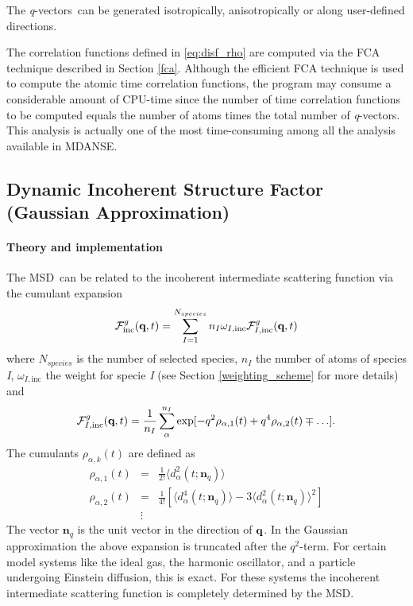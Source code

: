 \documentclass[a4paper,11pt]{article}
\newcommand{\qvects}{\textit{q}-vectors}
\begin{document}
The \qvects\ can be generated isotropically, anisotropically or along user-defined directions.

The correlation functions defined in \ref{eq:disf_rho} are computed via the \gls{FCA} technique described in Section \ref{fca}.
Although the efficient \gls{FCA} technique is used to compute the atomic time correlation functions, the program may consume a 
considerable amount of CPU-time since the number of time correlation functions to be computed equals the number of 
atoms times the total number of \qvects. This analysis is actually one of the most time-consuming among all the analysis available in 
\gls{MDANSE}.

\subsection{Dynamic Incoherent Structure Factor (Gaussian Approximation)}
\label{disfg}
\paragraph{Theory and implementation\\}
\label{disfg_theory}
The \gls{MSD}\ can be related to the incoherent intermediate scattering function  via the cumulant expansion
\cite{Rahman:1962,Yip:1980} 
\begin{equation}
\label{eq:fqt_cumulant}
{\cal F}^{g}_{\mathrm{inc}}(\textbf{q},t) = \sum^{N_{species}}_{I = 1} n_I \omega_{I,\mathrm{inc}} {\cal F}^{g}_{I,\mathrm{inc}}(\textbf{q},t)
\end{equation}
where $N_{species}$ is the number of selected species, $n_I$ the number of atoms of species \textit{I}, 
$\omega_{I,\mathrm{inc}}$ the weight for specie \textit{I} (see Section \ref{weighting_scheme} for more details) and
\begin{equation}
\label{eq:fqt_cumulant_1}
{\cal F}^{g}_{I,\mathrm{inc}}(\textbf{q},t) = \frac{1}{n_I}\sum^{n_I}_{\alpha} \exp[-q^2\rho_{\alpha,1}(t) + q^4\rho_{\alpha,2}(t) \mp\ldots].
\end{equation}
The cumulants $\rho_{\alpha,k}(t)$ are defined as
\begin{eqnarray}
\rho_{\alpha,1}(t) &= &\frac{1}{2!}
\langle d^2_\alpha(t;\textbf{n}_q) \rangle \\
\rho_{\alpha,2}(t) &= &\frac{1}{4!}\left[
\langle d_\alpha^4(t;\textbf{n}_q)\rangle - 3\langle d^2_\alpha(t;\textbf{n}_q) 
\rangle^2\right] \\
&\vdots &\nonumber
\end{eqnarray}
The vector $\textbf{n}_q$ is the unit vector in the direction of ${\bf q}$. In the Gaussian approximation the above 
expansion is truncated after the $q^2$-term. For certain model systems like the ideal gas, the harmonic oscillator, 
and a particle undergoing Einstein diffusion, this is exact. For these systems the incoherent intermediate scattering 
function is completely determined by the \gls{MSD}.
\end{document}
